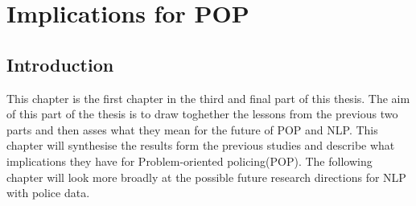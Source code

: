 \chapter{Implications for POP}


\section{Introduction} This chapter is the first chapter in the third and final part of this thesis. The aim of this part of the thesis is to draw toghether the lessons from the previous two parts and then asses what they mean for the future of POP and NLP.  This chapter will synthesise the results form the previous studies and describe what implications they have for Problem-oriented policing(POP). The following chapter will look more broadly at the possible future research directions for NLP with police data.



